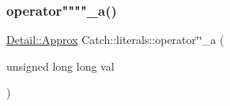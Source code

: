 \subsubsection{\texorpdfstring{operator""""\_a()}{operator""\_a()}\hspace{0.1cm}{\footnotesize\ttfamily [2/2]}}
{\footnotesize\ttfamily \mbox{\hyperlink{class_catch_1_1_detail_1_1_approx}{Detail\+::\+Approx}} Catch\+::literals\+::operator\char`\"{}\char`\"{}\+\_\+a (\begin{DoxyParamCaption}\item[{unsigned long long}]{val }\end{DoxyParamCaption})}

